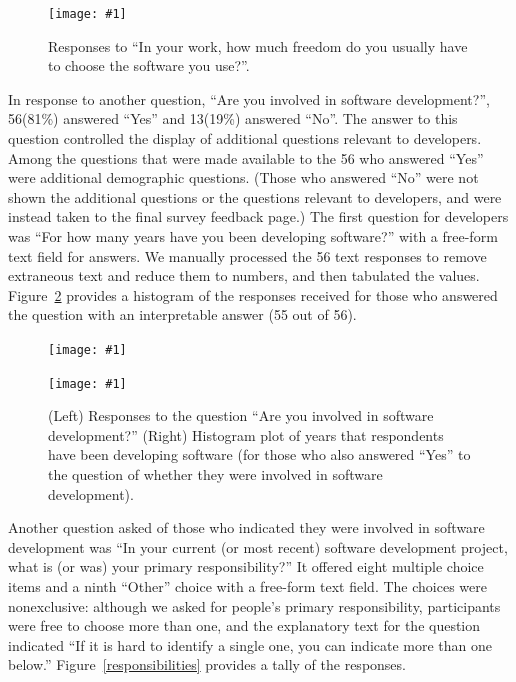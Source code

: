 \documentclass[review]{elsarticle}
\newcommand{\totalDevelopers}{56\xspace}
\newcommand{\totalNotDevelopers}{13\xspace}
\newcommand{\includefile}[1]{\texttt{[image: \#1]}}
\begin{document}
\begin{figure}[tb]
  \centering
  \includefile{files/plots/how-often-choose-software.pdf}
  \caption{Responses to ``In your work, how much freedom do you usually have to choose the software you use?''.}
  \label{freedom}
\end{figure}

In response to another question, ``Are you involved in software development?'', \totalDevelopers (81\%) answered ``Yes'' and \totalNotDevelopers (19\%) answered ``No''.  The answer to this question controlled the display of additional questions relevant to developers.  Among the questions that were made available to the \totalDevelopers who answered ``Yes'' were additional demographic questions.  (Those who answered ``No'' were not shown the additional questions or the questions relevant to developers, and were instead taken to the final survey feedback page.)  The first question for developers was ``For how many years have you been developing software?'' with a free-form text field for answers.  We manually processed the \totalDevelopers text responses to remove extraneous text and reduce them to numbers, and then tabulated the values.  Figure~\ref{years} provides a histogram of the responses received for those who answered the question with an interpretable answer (55 out of \totalDevelopers).


\begin{figure}[th]
  \begin{minipage}[b]{0.26\linewidth}
    \includefile{files/plots/number-of-developers.pdf}
  \end{minipage}%
  \begin{minipage}[b]{0.75\linewidth}
    \includefile{files/plots/histogram-years.pdf}
  \end{minipage}%
  \caption{(Left) Responses to the question  ``Are you involved in software development?'' (Right) Histogram plot of years that respondents have been developing software (for those who also answered ``Yes'' to the question of whether they were involved in software development).}
  \label{years}
\end{figure}

Another question asked of those who indicated they were involved in software development was ``In your current (or most recent) software development project, what is (or was) your primary responsibility?'' It offered eight multiple choice items and a ninth ``Other'' choice with a free-form text field.  The choices were nonexclusive: although we asked for people's primary responsibility, participants were free to choose more than one, and the explanatory text for the question indicated ``If it is hard to identify a single one, you can indicate more than one below.''  Figure~\ref{responsibilities} provides a tally of the responses.
\end{document}
